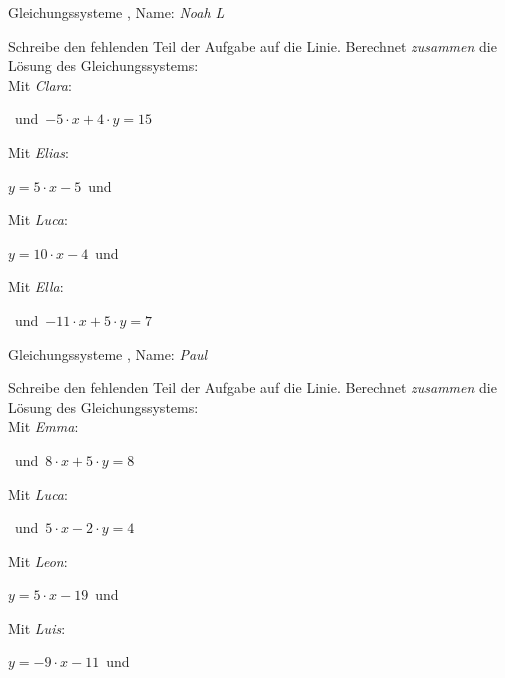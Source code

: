\newpage
\begin{center}\large Gleichungssysteme
, Name: \emph{Noah L}\end{center}
Schreibe den fehlenden Teil der Aufgabe auf die Linie. Berechnet \emph{zusammen} die Lösung des Gleichungssystems:
\\
\vfill Mit \emph{Clara}:
\begin{center}\underline{}
\mbox{ }und\mbox{ }$-5\cdot x+4\cdot y=15$\end{center}
\vfill Mit \emph{Elias}:
\begin{center}$y=5\cdot x-5$\mbox{ }und\mbox{ }\underline{}
\end{center}
\vfill Mit \emph{Luca}:
\begin{center}$y=10\cdot x-4$\mbox{ }und\mbox{ }\underline{}
\end{center}
\vfill Mit \emph{Ella}:
\begin{center}\underline{}
\mbox{ }und\mbox{ }$-11\cdot x+5\cdot y=7$\end{center}
\newpage
\begin{center}\large Gleichungssysteme
, Name: \emph{Paul}\end{center}
Schreibe den fehlenden Teil der Aufgabe auf die Linie. Berechnet \emph{zusammen} die Lösung des Gleichungssystems:
\\
\vfill Mit \emph{Emma}:
\begin{center}\underline{}
\mbox{ }und\mbox{ }$8\cdot x+5\cdot y=8$\end{center}
\vfill Mit \emph{Luca}:
\begin{center}\underline{}
\mbox{ }und\mbox{ }$5\cdot x-2\cdot y=4$\end{center}
\vfill Mit \emph{Leon}:
\begin{center}$y=5\cdot x-19$\mbox{ }und\mbox{ }\underline{}
\end{center}
\vfill Mit \emph{Luis}:
\begin{center}$y=-9\cdot x-11$\mbox{ }und\mbox{ }\underline{}
\end{center}
